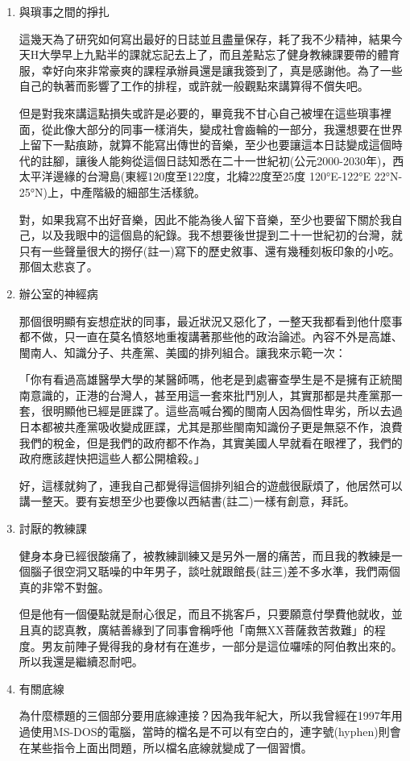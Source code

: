 \documentclass[a5paper, 12pt
]{book}
\begin{document}
\begin{enumerate}
\def\labelenumi{\arabic{enumi}.}
\item
  與瑣事之間的掙扎

  這幾天為了研究如何寫出最好的日誌並且盡量保存，耗了我不少精神，結果今天H大學早上九點半的課就忘記去上了，而且差點忘了健身教練課要帶的體育服，幸好向來非常豪爽的課程承辦員還是讓我簽到了，真是感謝他。為了一些自己的執著而影響了工作的排程，或許就一般觀點來講算得不償失吧。

  但是對我來講這點損失或許是必要的，畢竟我不甘心自己被埋在這些瑣事裡面，從此像大部分的同事一樣消失，變成社會齒輪的一部分，我還想要在世界上留下一點痕跡，就算不能寫出傳世的音樂，至少也要讓這本日誌變成這個時代的註腳，讓後人能夠從這個日誌知悉在二十一世紀初(公元2000-2030年)，西太平洋邊緣的台灣島(東經120度至122度，北緯22度至25度
  120°E-122°E 22°N-25°N)上，中產階級的細部生活樣貌。

  對，如果我寫不出好音樂，因此不能為後人留下音樂，至少也要留下關於我自己，以及我眼中的這個島的紀錄。我不想要後世提到二十一世紀初的台灣，就只有一些聲量很大的撈仔(註一)寫下的歷史敘事、還有幾種刻板印象的小吃。那個太悲哀了。
\item
  辦公室的神經病

  那個很明顯有妄想症狀的同事，最近狀況又惡化了，一整天我都看到他什麼事都不做，只一直在莫名憤怒地重複講著那些他的政治論述。內容不外是高雄、閩南人、知識分子、共產黨、美國的排列組合。讓我來示範一次：

  「你有看過高雄醫學大學的某醫師嗎，他老是到處審查學生是不是擁有正統閩南意識的，正港的台灣人，甚至用這一套來批鬥別人，其實那都是共產黨那一套，很明顯他已經是匪諜了。這些高喊台獨的閩南人因為個性卑劣，所以去過日本都被共產黨吸收變成匪諜，尤其是那些閩南知識份子更是無惡不作，浪費我們的稅金，但是我們的政府都不作為，其實美國人早就看在眼裡了，我們的政府應該趕快把這些人都公開槍殺。」

  好，這樣就夠了，連我自己都覺得這個排列組合的遊戲很厭煩了，他居然可以講一整天。要有妄想至少也要像以西結書(註二)一樣有創意，拜託。
\item
  討厭的教練課

  健身本身已經很酸痛了，被教練訓練又是另外一層的痛苦，而且我的教練是一個腦子很空洞又聒噪的中年男子，談吐就跟館長(註三)差不多水準，我們兩個真的非常不對盤。

  但是他有一個優點就是耐心很足，而且不挑客戶，只要願意付學費他就收，並且真的認真教，廣結善緣到了同事會稱呼他「南無XX菩薩救苦救難」的程度。男友前陣子覺得我的身材有在進步，一部分是這位囉嗦的阿伯教出來的。所以我還是繼續忍耐吧。
\item
  有關底線

  為什麼標題的三個部分要用底線連接？因為我年紀大，所以我曾經在1997年用過使用MS-DOS的電腦，當時的檔名是不可以有空白的，連字號(hyphen)則會在某些指令上面出問題，所以檔名底線就變成了一個習慣。
\end{enumerate}
\end{document}
